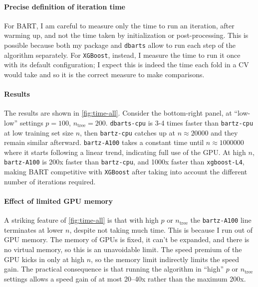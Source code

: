 \documentclass{article}
\let\oldmarginpar\marginpar
\renewcommand{\marginpar}[1]{\oldmarginpar{\sffamily\scriptsize #1}}
\renewcommand{\marginpar}[1]{\relax} %
\begin{document}
    \paragraph{Precise definition of iteration time}

    For BART, I am careful to measure only the time to run an iteration, after warming up, and not the time taken by initialization or post-processing. This is possible because both my package and \texttt{dbarts} allow to run each step of the algorithm separately. For \texttt{XGBoost}, instead, I measure the time to run it once with its default configuration; I expect this is indeed the time each fold in a CV would take and so it is the correct measure to make comparisons.\marginpar{I would really like an XGBoost expert to weigh in.}

    \paragraph{Results}

    The results are shown in \autoref{fig:time-all}. Consider the bottom-right panel, at ``low-low'' settings $p=100$, $n_\text{tree}=200$. \texttt{dbarts-cpu} is 3-4 times faster than \texttt{bartz-cpu} at low training set size $n$, then \texttt{bartz-cpu} catches up at $n\approx \num{20000}$ and they remain similar afterward. \texttt{bartz-A100} takes a constant time until $n \approx \num{1000000}$ where it starts following a linear trend, indicating full use of the GPU. At high $n$, \texttt{bartz-A100} is 200x faster than \texttt{bartz-cpu}, and 1000x faster than \texttt{xgboost-L4}, making BART competitive with \texttt{XGBoost} after taking into account the different number of iterations required.

    \paragraph{Effect of limited GPU memory}

    A striking feature of \autoref{fig:time-all} is that with high $p$ or $n_\text{tree}$ the \texttt{bartz-A100} line terminates at lower $n$, despite not taking much time. This is because I run out of GPU memory. The memory of GPUs is fixed, it can't be expanded, and there is no virtual memory, so this is an unavoidable limit. The speed premium of the GPU kicks in only at high $n$, so the memory limit indirectly limits the speed gain. The practical consequence is that running the algorithm in ``high'' $p$ or $n_\text{tree}$ settings allows a speed gain of at most 20--40x rather than the maximum 200x.
\end{document}
